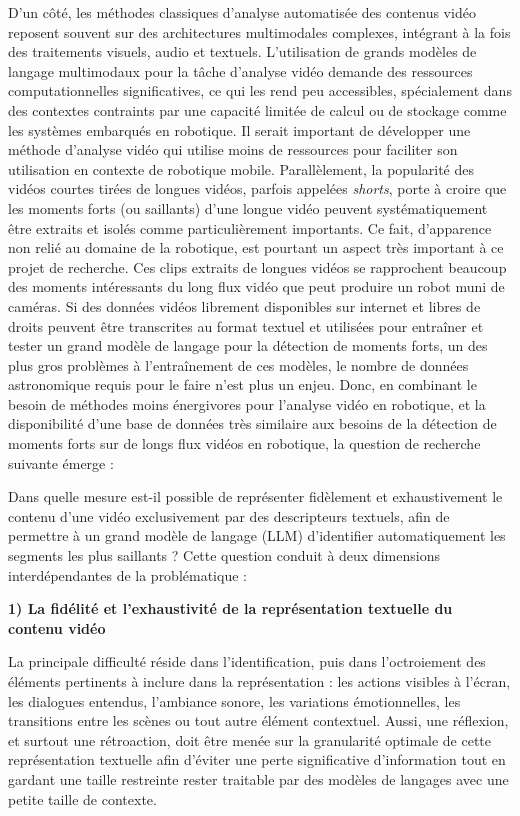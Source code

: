 \documentclass[livre]{udes-genie-these}
\begin{document}
D’un côté, les méthodes classiques d'analyse automatisée des contenus vidéo reposent souvent sur des architectures multimodales complexes, intégrant à la fois des traitements visuels, audio et textuels. L’utilisation de grands modèles de langage multimodaux pour la tâche d’analyse vidéo demande des ressources computationnelles significatives, ce qui les rend peu accessibles, spécialement dans des contextes contraints par une capacité limitée de calcul ou de stockage comme les systèmes embarqués en robotique. Il serait important de développer une méthode d’analyse vidéo qui utilise moins de ressources pour faciliter son utilisation en contexte de robotique mobile.
Parallèlement, la popularité des vidéos courtes tirées de longues vidéos, parfois appelées \textit{shorts}, porte à croire que les moments forts (ou saillants) d'une longue vidéo peuvent systématiquement être extraits et isolés comme particulièrement importants. Ce fait, d’apparence non relié au domaine de la robotique, est pourtant un aspect très important à ce projet de recherche. Ces clips extraits de longues vidéos se rapprochent beaucoup des moments intéressants du long flux vidéo que peut produire un robot muni de caméras. Si des données vidéos librement disponibles sur internet et libres de droits peuvent être transcrites au format textuel et utilisées pour entraîner et tester un grand modèle de langage pour la détection de moments forts, un des plus gros problèmes à l’entraînement de ces modèles, le nombre de données astronomique requis pour le faire n’est plus un enjeu.
Donc, en combinant le besoin de méthodes moins énergivores pour l’analyse vidéo en robotique, et la disponibilité d’une base de données très similaire aux besoins de la détection de moments forts sur de longs flux vidéos en robotique, la question de recherche suivante émerge :

Dans quelle mesure est-il possible de représenter fidèlement et exhaustivement le contenu d'une vidéo exclusivement par des descripteurs textuels, afin de permettre à un grand modèle de langage (LLM) d'identifier automatiquement les segments les plus saillants ?
Cette question conduit à deux dimensions interdépendantes de la problématique :

\textbf{1) La fidélité et l'exhaustivité de la représentation textuelle du contenu vidéo}

La principale difficulté réside dans l'identification, puis dans l’octroiement des éléments pertinents à inclure dans la représentation : les actions visibles à l'écran, les dialogues entendus, l’ambiance sonore, les variations émotionnelles, les transitions entre les scènes ou tout autre élément contextuel. Aussi, une réflexion, et surtout une rétroaction, doit être menée sur la granularité optimale de cette représentation textuelle afin d'éviter une perte significative d'information tout en gardant une taille restreinte rester traitable par des modèles de langages avec une petite taille de contexte. 
\end{document}
